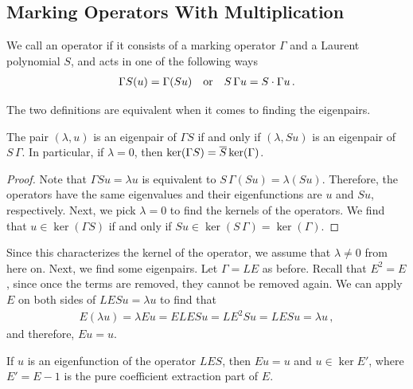 \subsection{Marking Operators With Multiplication}
\begin{defn}
We call an operator  if it consists of a marking operator $\Gamma$ and a Laurent polynomial $S$, and acts in one of the following ways
\begin{align}
	\Gamma S(u) = \Gamma(Su)\quad\text{or}\quad S\,\Gamma u = S\cdot \Gamma u\,.
\end{align}
\end{defn}
The two definitions are equivalent when it comes to finding the eigenpairs.
\begin{prop} The pair $(\lambda,u)$ is an eigenpair of $\Gamma S$ if and only if $(\lambda, Su)$ is an eigenpair of $S\,\Gamma$. In particular, if $\lambda = 0$, then $\ker(\Gamma S) = \overline{S} \ker(\Gamma)$.
\end{prop}
\begin{proof} Note that $\Gamma Su = \lambda u$ is equivalent to $S\,\Gamma (Su) = \lambda (Su)$. Therefore, the operators have the same eigenvalues and their eigenfunctions are $u$ and $Su$, respectively. Next, we pick $\lambda = 0$ to find the kernels of the operators. We find that $u \in \ker(\Gamma S)$ if and only if $Su \in \ker(S\,\Gamma) = \ker(\Gamma)$.
\end{proof}
Since this characterizes the kernel of the operator, we assume that $\lambda \neq 0$ from here on. Next, we find some eigenpairs. Let $\Gamma = LE$ as before. Recall that $E^2 = E$, since once the terms are removed, they cannot be removed again. We can apply $E$ on both sides of $LES u = \lambda u$ to find that
\begin{align}
	E(\lambda u) = \lambda Eu = ELES u = LE^2S u = LES u = \lambda u\,,
\end{align}
and therefore, $Eu = u$.
\begin{lem} \label{prop:EfixU}If $u$ is an eigenfunction of the operator $LES$, then $Eu = u$ and $u \in \ker E'$, where $E' = E - 1$ is the pure coefficient extraction part of $E$.
\end{lem}



